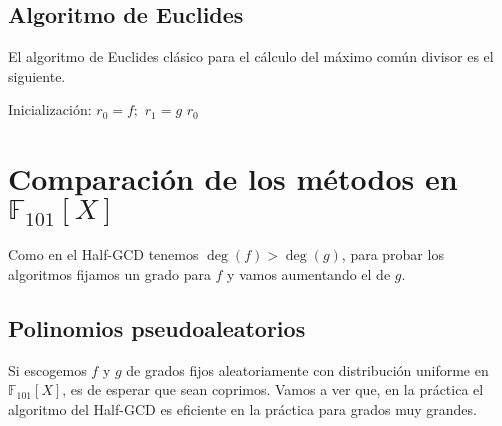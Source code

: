 \documentclass[10pt]{article}
\theoremstyle{definition}
\begin{document}
\subsection{Algoritmo de Euclides}
El algoritmo de Euclides clásico para el cálculo del máximo común divisor es el siguiente.
\begin{center}
\begin{algorithm}[H]
\SetAlgoLined\DontPrintSemicolon
{}
 Inicialización: $r_0 = f;$ $r_1 = g$\;
 \Return $r_0$
\end{algorithm}\end{center}
\section{Comparación de los métodos en $\mathbb{F}_{101}[X]$}
Como en el Half-GCD tenemos $\deg(f)>\deg(g)$, para probar los algoritmos fijamos un grado para $f$ y vamos aumentando el de $g$.
\subsection{Polinomios pseudoaleatorios}
Si escogemos $f$ y $g$ de grados fijos aleatoriamente con distribución uniforme en $\mathbb{F}_{101}[X]$, es de esperar que sean coprimos. Vamos a ver que, en la práctica el algoritmo del Half-GCD es eficiente en la práctica para grados muy grandes.
\end{document}
